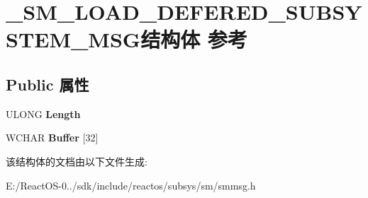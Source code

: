 \hypertarget{struct___s_m___l_o_a_d___d_e_f_e_r_e_d___s_u_b_s_y_s_t_e_m___m_s_g}{}\section{\+\_\+\+S\+M\+\_\+\+L\+O\+A\+D\+\_\+\+D\+E\+F\+E\+R\+E\+D\+\_\+\+S\+U\+B\+S\+Y\+S\+T\+E\+M\+\_\+\+M\+S\+G结构体 参考}
\label{struct___s_m___l_o_a_d___d_e_f_e_r_e_d___s_u_b_s_y_s_t_e_m___m_s_g}
\subsection*{Public 属性}
\begin{DoxyCompactItemize}
\item 
\mbox{\label{struct___s_m___l_o_a_d___d_e_f_e_r_e_d___s_u_b_s_y_s_t_e_m___m_s_g_a5fd5bd5ef8435bf86b7fe4d28631083f}} 
U\+L\+O\+NG {\bfseries Length}
\item 
\mbox{\label{struct___s_m___l_o_a_d___d_e_f_e_r_e_d___s_u_b_s_y_s_t_e_m___m_s_g_ac15bfef6ac37d3065aaaffa6c6e92bd1}} 
W\+C\+H\+AR {\bfseries Buffer} \mbox{[}32\mbox{]}
\end{DoxyCompactItemize}


该结构体的文档由以下文件生成\+:\begin{DoxyCompactItemize}
\item 
E\+:/\+React\+O\+S-\/0../sdk/include/reactos/subsys/sm/smmsg.\+h\end{DoxyCompactItemize}
